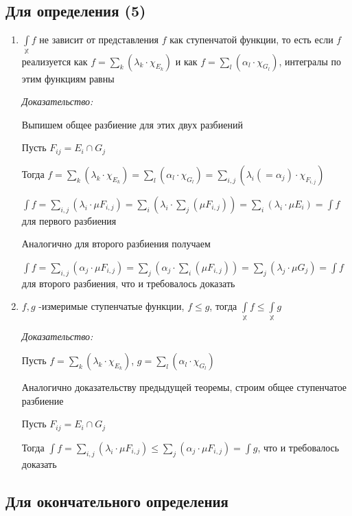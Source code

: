 \documentclass[paper=a4, fontsize=17pt]{article}
\begin{document}
\subsection{Для определения (5)}
\begin{enumerate}
	\item $\int\limits_{\mathds{X}}f$ не зависит от представления $f$ как ступенчатой функции, то есть если $f$ реализуется как $f = \sum\limits_{k}(\lambda_k \cdot \chi_{E_k})$ и как $f = \sum\limits_{l}(\alpha_l \cdot \chi_{G_l})$, интегралы по этим функциям равны

	\emph{Доказательство:}

	Выпишем общее разбиение для этих двух разбиений

	Пусть $F_{ij} = E_i \cap G_j$

	Тогда $f = \sum\limits_{k}(\lambda_k \cdot \chi_{E_k}) = \sum\limits_{l}(\alpha_l \cdot \chi_{G_l}) = \sum\limits_{i, j}(\lambda_i (= \alpha_j) \cdot \chi_{F_{i, j}})$

	$\int f = \sum\limits_{i, j}(\lambda_i \cdot \mu F_{i, j}) = \sum\limits_i (\lambda_i \cdot \sum\limits_j (\mu F_{i, j})) = \sum\limits_i (\lambda_i \cdot \mu E_i) = \int f$ для первого разбиения

	Аналогично для второго разбиения получаем

	$\int f = \sum\limits_{i, j}(\alpha_j \cdot \mu F_{i, j}) = \sum\limits_j (\alpha_j \cdot \sum\limits_i (\mu F_{i, j})) = \sum\limits_j (\lambda_j \cdot \mu G_j) = \int f$ для второго разбиения, что и требовалось доказать

	\item $f, g$ -измеримые ступенчатые функции, $f \leqslant g$, тогда $\int\limits_{\mathds{X}} f \leqslant \int\limits_{\mathds{X}} g$

	\emph{Доказательство:}

	Пусть $f = \sum\limits_{k}(\lambda_k \cdot \chi_{E_k})$, $g = \sum\limits_{l}(\alpha_l \cdot \chi_{G_l})$

	Аналогично доказательству предыдущей теоремы, строим общее ступенчатое разбиение

	Пусть $F_{ij} = E_i \cap G_j$

	Тогда $\int f = \sum\limits_{i, j}(\lambda_i \cdot \mu F_{i, j}) \leqslant \sum\limits_j(\alpha_j \cdot \mu F_{i, j}) = \int g$, что и требовалось доказать
\end{enumerate}

\subsection{Для окончательного определения}
\end{document}
